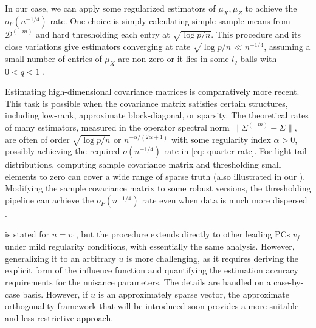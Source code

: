 \documentclass[11pt]{article}
\newenvironment{revblock}
  {\color{teal}}
  {}
\begin{document}
\begin{revblock}
In our case, we can apply some regularized estimators of $\mu_X, \mu_Z$ to achieve the $o_P(n^{-1/4})$ rate. One choice is simply calculating simple sample means from $\mathcal{D}^{(-m)}$ and hard thresholding each entry at $\sqrt{\log p/n}$. This procedure and its close variations give estimators converging at rate $\sqrt{\log p/n} \ll n^{-1/4}$, assuming a small number of entries of $\mu_X$ are non-zero or it lies in some $l_q$-balls with $0<q<1$ \cite{donoho1994, johnstone2019gaussian}.

Estimating high-dimensional covariance matrices is comparatively more recent. This task is possible when the covariance matrix satisfies certain structures, including low-rank, approximate block-diagonal, or sparsity. The theoretical rates of many estimators, measured in the operator spectral norm $\|\Sigma^{(-m)} - \Sigma\|$, are often of order $\sqrt{\log p/n}$ or $n^{-\alpha/(2\alpha + 1)}$ with some regularity index $\alpha > 0$, possibly achieving the required $o(n^{-1/4})$ rate in \eqref{eq: quarter rate}. For light-tail distributions, computing sample covariance matrix and thresholding small elements to zero can cover a wide range of sparse truth (also illustrated in our ). Modifying the sample covariance matrix to some robust versions, the thresholding pipeline can achieve the $o_P(n^{-1/4})$ rate even when data is much more dispersed \cite{avella2018robust}.
\end{revblock}

 is stated for $u = v_1$, but the procedure extends directly to other leading PCs $v_j$ under mild regularity conditions, with essentially the same analysis. However, generalizing it to an arbitrary $u$ is more challenging, as it requires deriving the explicit form of the influence function and quantifying the estimation accuracy requirements for the nuisance parameters. The details are handled on a case-by-case basis. However, if $u$ is an approximately sparse vector, the approximate orthogonality framework that will be introduced soon provides a more suitable and less restrictive approach.
\end{document}
